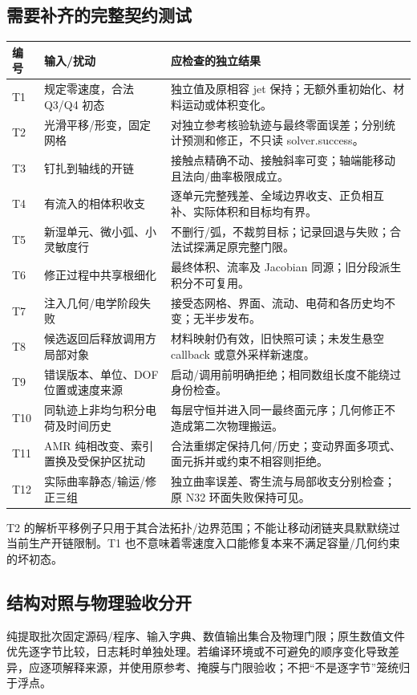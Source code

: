 \documentclass[UTF8,a4paper,11pt,fontset=fandol]{ctexart}
\begin{document}
\subsection{需要补齐的完整契约测试}
\begin{longtable}{@{}P{.09\textwidth}P{.29\textwidth}P{.56\textwidth}@{}}
\toprule 编号 & 输入/扰动 & 应检查的独立结果\\\midrule\endhead
T1 & 规定零速度，合法 Q3/Q4 初态 & 独立值及原相容 jet 保持；无额外重初始化、材料运动或体积变化。\\
T2 & 光滑平移/形变，固定网格 & 对独立参考核验轨迹与最终零面误差；分别统计预测和修正，不只读 solver.success。\\
T3 & 钉扎到轴线的开链 & 接触点精确不动、接触斜率可变；轴端能移动且法向/曲率极限成立。\\
T4 & 有流入的相体积收支 & 逐单元完整残差、全域边界收支、正负相互补、实际体积和目标均有界。\\
T5 & 新湿单元、微小弧、小灵敏度行 & 不删行/弧，不裁剪目标；记录回退与失败；合法试探满足原完整门限。\\
T6 & 修正过程中共享根细化 & 最终体积、流率及 Jacobian 同源；旧分段派生积分不可复用。\\
T7 & 注入几何/电学阶段失败 & 接受态网格、界面、流动、电荷和各历史均不变；无半步发布。\\
T8 & 候选返回后释放调用方局部对象 & 材料映射仍有效，旧快照可读；未发生悬空 callback 或意外采样新速度。\\
T9 & 错误版本、单位、DOF 位置或速度来源 & 启动/调用前明确拒绝；相同数组长度不能绕过身份检查。\\
T10 & 同轨迹上非均匀积分电荷及时间历史 & 每层守恒并进入同一最终面元序；几何修正不造成第二次物理搬运。\\
T11 & AMR 纯相改变、索引置换及受保护区扰动 & 合法重绑定保持几何/历史；变动界面多项式、面元拆并或约束不相容则拒绝。\\
T12 & 实际曲率静态/输运/修正三组 & 独立曲率误差、寄生流与局部收支分别检查；原 N32 环面失败保持可见。\\
\bottomrule
\end{longtable}
T2 的解析平移例子只用于其合法拓扑/边界范围；不能让移动闭链夹具默默绕过当前生产开链限制。T1 也不意味着零速度入口能修复本来不满足容量/几何约束的坏初态。

\subsection{结构对照与物理验收分开}
纯提取批次固定源码/程序、输入字典、数值输出集合及物理门限；原生数值文件优先逐字节比较，日志耗时单独处理。若编译环境或不可避免的顺序变化导致差异，应逐项解释来源，并使用原参考、掩膜与门限验收；不把“不是逐字节”笼统归于浮点。
\end{document}
